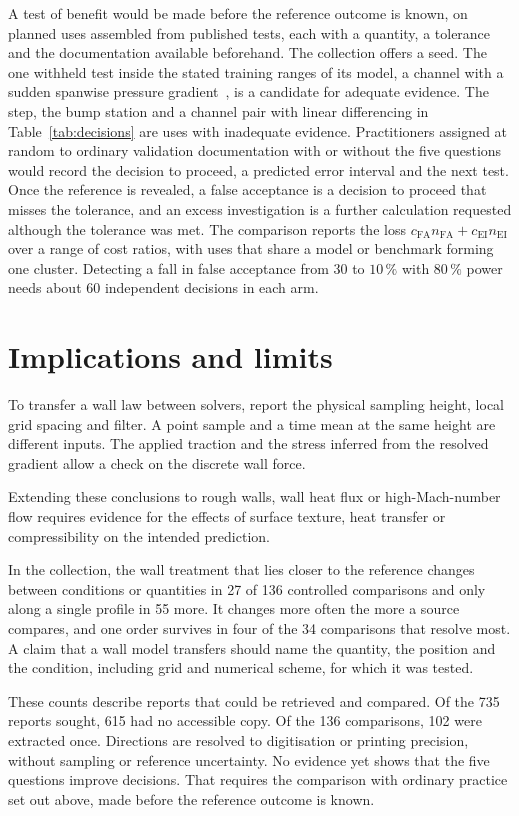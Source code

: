 \documentclass[pdflatex,sn-nature,iicol]{sn-jnl}
\begin{document}
A test of benefit would be made before the reference outcome is known, on planned uses assembled from published tests, each with a quantity, a tolerance and the documentation available beforehand. The collection offers a seed. The one withheld test inside the stated training ranges of its model, a channel with a sudden spanwise pressure gradient~\cite{LozanoDuranBae2023}, is a candidate for adequate evidence. The step, the bump station and a channel pair with linear differencing in Table~\ref{tab:decisions} are uses with inadequate evidence. Practitioners assigned at random to ordinary validation documentation with or without the five questions would record the decision to proceed, a predicted error interval and the next test. Once the reference is revealed, a false acceptance is a decision to proceed that misses the tolerance, and an excess investigation is a further calculation requested although the tolerance was met. The comparison reports the loss $c_\mathrm{FA}n_\mathrm{FA}+c_\mathrm{EI}n_\mathrm{EI}$ over a range of cost ratios, with uses that share a model or benchmark forming one cluster. Detecting a fall in false acceptance from $30$ to $10\,\%$ with $80\,\%$ power needs about 60 independent decisions in each arm.

\section{Implications and limits}\label{sec:outlook}
To transfer a wall law between solvers, report the physical sampling height, local grid spacing and filter. A point sample and a time mean at the same height are different inputs. The applied traction and the stress inferred from the resolved gradient allow a check on the discrete wall force.

Extending these conclusions to rough walls, wall heat flux or high-Mach-number flow requires evidence for the effects of surface texture, heat transfer or compressibility on the intended prediction.

In the collection, the wall treatment that lies closer to the reference changes between conditions or quantities in 27 of 136 controlled comparisons and only along a single profile in 55 more. It changes more often the more a source compares, and one order survives in four of the 34 comparisons that resolve most. A claim that a wall model transfers should name the quantity, the position and the condition, including grid and numerical scheme, for which it was tested.

These counts describe reports that could be retrieved and compared. Of the 735 reports sought, 615 had no accessible copy. Of the 136 comparisons, 102 were extracted once. Directions are resolved to digitisation or printing precision, without sampling or reference uncertainty. No evidence yet shows that the five questions improve decisions. That requires the comparison with ordinary practice set out above, made before the reference outcome is known.
\end{document}
